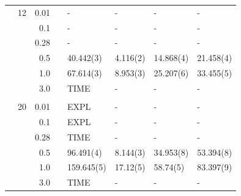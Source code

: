 \begin{table}
\begin{tabularx}{\textwidth}{R{1.5cm}rrcR{2.3cm}R{2.3cm}R{2.3cm}R{2.3cm}}
		&12 & 0.01 && - & - & - & - \\
		&& 0.1 && - & - & - & - \\
		&& 0.28 && - & - & - & - \\
		&& 0.5 && 40.442(3) & 4.116(2) & 14.868(4) & 21.458(4) \\
		&& 1.0 && 67.614(3) & 8.953(3) & 25.207(6) & 33.455(5) \\
		&& 3.0 && TIME & - & - & - \\ \hdashline \\
		
		&20 & 0.01 && EXPL & - & - & - \\
		&& 0.1 && EXPL & - & - & - \\
		&& 0.28 && TIME & - & - & - \\
		&& 0.5 && 96.491(4) & 8.144(3) & 34.953(8) & 53.394(8) \\
		&& 1.0 && 159.645(5) & 17.12(5) & 58.74(5) & 83.397(9) \\
		&& 3.0 && TIME & - & - & - \\ \hline \hline
	\end{tabularx}
\end{table} 

